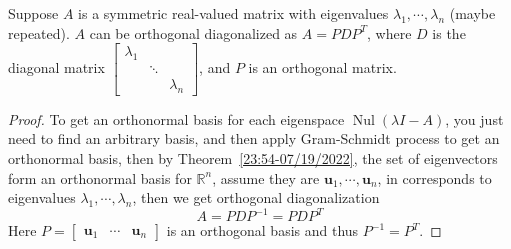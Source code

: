 \documentclass{beamer}
\DeclareMathOperator{\Nul}{Nul}
\theoremstyle{definition}
\theoremstyle{remark}
\begin{document}
\begin{frame}[t]
\begin{theorem}
Suppose $A$ is a symmetric real-valued matrix with eigenvalues $\lambda_1,\cdots,\lambda_n$ (maybe repeated)\pause. $A$ can be orthogonal diagonalized as $A=PDP^T$\pause, where $D$ is the diagonal matrix $\begin{bmatrix}
\lambda_1&&\\
&\ddots&\\
&&\lambda_n
\end{bmatrix}$, and $P$ is an orthogonal matrix.
\end{theorem}

\begin{proof}
To get an orthonormal basis for each eigenspace $\Nul(\lambda I-A)$, you just need to find an arbitrary basis, and then apply Gram-Schmidt process to get an orthonormal basis\pause, then by Theorem~\ref{23:54-07/19/2022}, the set of eigenvectors form an orthonormal basis for $\mathbb R^n$\pause, assume they are $\mathbf u_1,\cdots,\mathbf u_n$, in corresponds to eigenvalues $\lambda_1,\cdots,\lambda_n$\pause, then we get orthogonal diagonalization
\[
A=PDP^{-1}=PDP^T
\]
Here $P=\begin{bmatrix}
\mathbf u_1&\cdots&\mathbf u_n
\end{bmatrix}$ is an orthogonal basis and thus $P^{-1}=P^T$.
\end{proof}
\end{frame}
\end{document}

